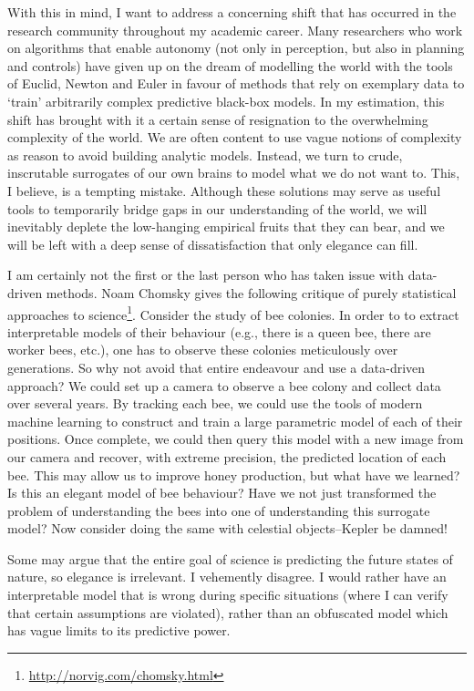 With this in mind, I want to address a concerning shift that has occurred in the research community throughout my academic career. Many researchers who work on algorithms that enable autonomy (not only in perception, but also in planning and controls) have given up on the dream of modelling the world with the tools of Euclid, Newton and Euler in favour of methods that rely on exemplary data to `train' arbitrarily complex predictive black-box models. In my estimation, this shift has brought with it a certain sense of resignation to the overwhelming complexity of the world. We are often content to use vague notions of complexity as reason to avoid building analytic models. Instead, we turn to crude, inscrutable surrogates of our own brains to model what we do not want to. This, I believe, is a tempting mistake. Although these solutions may serve as useful tools to temporarily bridge gaps in our understanding of the world, we will inevitably deplete the low-hanging empirical fruits that they can bear, and we will be left with a deep sense of dissatisfaction that only elegance can fill. 

I am certainly not the first or the last person who has taken issue with data-driven methods. Noam Chomsky gives the following critique of purely statistical approaches to science\footnote{\url{http://norvig.com/chomsky.html}}. Consider the study of bee colonies. In order to to extract interpretable models of their behaviour (e.g., there is a queen bee, there are worker bees, etc.), one has to observe these colonies meticulously over generations. So why not avoid that entire endeavour and use a data-driven approach? We could set up a camera to observe a bee colony and collect data over several years. By tracking each bee, we could use the tools of modern machine learning to construct and train a large parametric model of each of their positions. Once complete, we could then query this model with a new image from our camera and recover, with extreme precision, the predicted location of each bee. This may allow us to improve honey production, but what have we learned? Is this an elegant model of bee behaviour? Have we not just transformed the problem of understanding the bees into one of understanding this surrogate model? Now consider doing the same with celestial objects--Kepler be damned!

Some may argue that the entire goal of science is predicting the future states of nature, so elegance is irrelevant. I vehemently disagree. I would rather have an interpretable model that is wrong during specific situations (where I can verify that certain assumptions are violated), rather than an obfuscated model which has vague limits to its predictive power.

